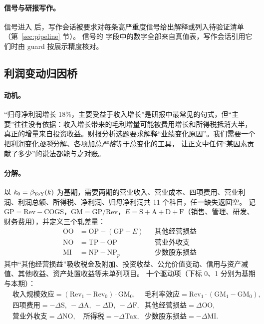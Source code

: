 \paragraph{信号与研报写作。}
信号进入  后，写作会话被要求对每条高严重度信号给出解释或列入待验证清单（第~\ref{sec:pipeline} 节）。
信号的  字段中的数字全部来自真值表，写作会话引用它们时由 guard 按展示精度核对。

\subsection{利润变动归因桥}
\label{sec:an-bridge}

\paragraph{动机。}
“归母净利润增长 18\%，主要受益于收入增长”是研报中最常见的句式，但“主要”往往没有依据：收入增长带来的毛利增量可能被费用增长和所得税抵消大半，
真正的增量来自投资收益。财报分析选题要求解释“业绩变化原因”。我们需要一个把利润变化\emph{逐项}分解、各项加总\emph{严格}等于总变化的工具，
让正文中任何“某因素贡献了多少”的说法都能与之对账。

\paragraph{分解。}
 以 $k_0=\beta_{\operatorname{YoY}}(k)$ 为基期，需要两期的营业收入、营业成本、四项费用、营业利润、利润总额、所得税、净利润、归母净利润共 11 个科目，任一缺失返回空。
记 $\text{GP}=\text{Rev}-\text{COGS}$，$\text{GM}=\text{GP}/\text{Rev}$，$E=\text{S}+\text{A}+\text{D}+\text{F}$（销售、管理、研发、财务费用），并定义三个轧差量：
\begin{align*}
\text{OO} &= \text{OP}-(\text{GP}-E) && \text{其他经营损益}\\
\text{NO} &= \text{TP}-\text{OP} && \text{营业外收支}\\
\text{MI} &= \text{NP}-\text{NP}_p && \text{少数股东损益}
\end{align*}
其中“其他经营损益”吸收税金及附加、投资收益、公允价值变动、信用与资产减值、其他收益、资产处置收益等未单列项目。
十个驱动项（下标 0、1 分别为基期与本期）：
\begin{equation}
\begin{aligned}
&\text{收入规模效应}=(\text{Rev}_1-\text{Rev}_0)\cdot\text{GM}_0, &&\text{毛利率效应}=\text{Rev}_1\cdot(\text{GM}_1-\text{GM}_0),\\
&\text{四项费用}=-\Delta\text{S},\ -\Delta\text{A},\ -\Delta\text{D},\ -\Delta\text{F}, &&\text{其他经营损益}=\Delta\text{OO},\\
&\text{营业外收支}=\Delta\text{NO},\quad \text{所得税}=-\Delta\text{Tax}, &&\text{少数股东损益}=-\Delta\text{MI}.
\end{aligned}
\label{eq:an-bridge-items}
\end{equation}

